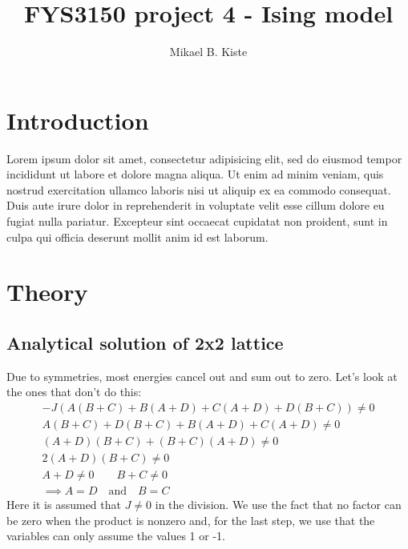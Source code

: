 \documentclass[a4paper, 12pt]{article}
\author{Mikael B. Kiste}
\title{FYS3150 project 4 - Ising model}
\begin{document}
	\maketitle
	
	
	\tableofcontents
	
	\newpage
	\section{Introduction}
	Lorem ipsum dolor sit amet, consectetur adipisicing elit, sed do eiusmod
	tempor incididunt ut labore et dolore magna aliqua. Ut enim ad minim veniam,
	quis nostrud exercitation ullamco laboris nisi ut aliquip ex ea commodo
	consequat. Duis aute irure dolor in reprehenderit in voluptate velit esse
	cillum dolore eu fugiat nulla pariatur. Excepteur sint occaecat cupidatat non
	proident, sunt in culpa qui officia deserunt mollit anim id est laborum.

	\newpage
	\section{Theory}
	
	\subsection{Analytical solution of 2x2 lattice}
	Due to symmetries, most energies cancel out and sum out to zero. Let's look at the ones that don't do this:
	\begin{align*}
		-J(A(B+C)+B(A+D)+C(A+D)+D(B+C)) \neq 0\\
		A(B+C)+D(B+C)+B(A+D)+C(A+D) \neq 0 \\
		(A+D)(B+C)+(B+C)(A+D) \neq 0 \\
		2(A+D)(B+C) \neq 0 \\
		A+D \neq 0 \qquad B+C \neq 0 \\
		\implies A=D \quad \mathrm{and} \quad B=C
	\end{align*}
	Here it is assumed that $J\neq 0$ in the division. We use the fact that no factor can be zero when the product is nonzero and, for the last step, we use that the variables can only assume the values 1 or -1.
\end{document}

